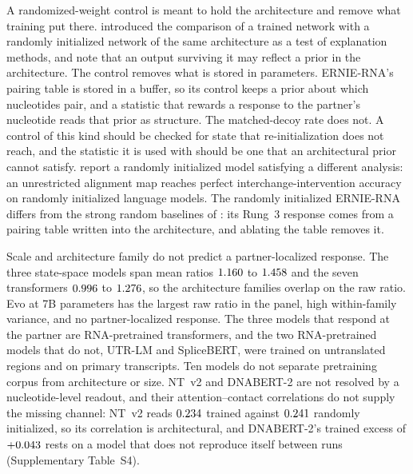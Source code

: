 \documentclass[11pt]{article}
\begin{document}
A randomized-weight control is meant to hold the architecture and remove what
training put there. \citet{adebayo2018sanity} introduced the comparison of a
trained network with a randomly initialized network of the same architecture as
a test of explanation methods, and note that an output surviving it may reflect
a prior in the architecture. The control removes what is stored in parameters. ERNIE-RNA's
pairing table is stored in a buffer, so its control keeps a prior about which
nucleotides pair, and a statistic that rewards a response to the partner's
nucleotide reads that prior as structure. The matched-decoy rate does not. A
control of this kind should be checked for state that re-initialization does
not reach, and the statistic it is used with should be one that an
architectural prior cannot satisfy. \citet{sutter2025non} report a randomly
initialized model satisfying a different analysis: an unrestricted alignment
map reaches perfect interchange-intervention accuracy on randomly initialized
language models. The randomly initialized ERNIE-RNA differs from the strong
random baselines of \citet{vishniakov2024tokenization}: its Rung~3 response
comes from a pairing table written into the architecture, and ablating the
table removes it.

Scale and architecture family do not predict a partner-localized response. The
three state-space models span mean ratios $1.160{}$ to $1.458{}$
and the seven transformers $0.996{}$ to $1.276{}$, so the
architecture families overlap on the raw ratio. Evo at 7B
parameters has the largest raw ratio in the panel, high within-family variance,
and no partner-localized response. The three models that respond at the partner
are RNA-pretrained transformers, and the two RNA-pretrained models that do not,
UTR-LM and SpliceBERT, were trained on untranslated regions and on primary
transcripts. Ten models do not separate pretraining corpus from architecture or
size. NT~v2 and DNABERT-2 are not resolved by a nucleotide-level readout, and
their attention--contact correlations do not supply the missing channel: NT~v2
reads $0.234{}$ trained against $0.241{}$ randomly
initialized, so its correlation is architectural, and DNABERT-2's trained
excess of $+0.043{}$ rests on a model that does not reproduce
itself between runs (Supplementary Table~S4).

\end{document}
